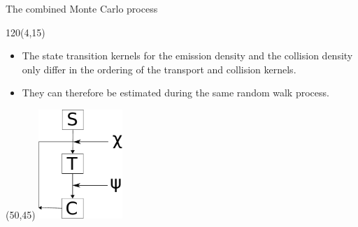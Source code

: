 \documentclass{beamer}
\begin{document}
\begin{frame}{The combined Monte Carlo process}

  \begin{textblock}{120}(4,15)
    \begin{itemize}
      \item The state transition kernels for the emission density and the
        collision density only differ in the ordering of the transport and
        collision kernels.
      \item They can therefore be estimated during the same random walk process.
    \end{itemize}
  \end{textblock}

  \begin{textblock}{20}(50,45)
    \includegraphics[width=1.25in]{../document/chapters/random_walk_process_derivation/random_walk_process.pdf}
  \end{textblock}


\end{frame}

\end{document}
